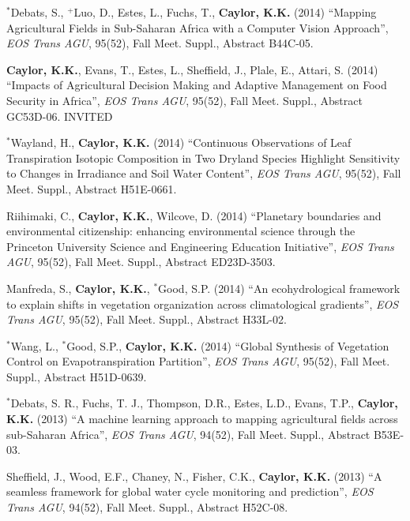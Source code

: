 \documentclass[10pt]{report}
\begin{document}
\begin{etaremune}
\item $^{*}$Debats, S., $^{+}$Luo, D., Estes, L., Fuchs, T.,  \textbf{Caylor, K.K.} (2014) ``Mapping Agricultural Fields in Sub-Saharan Africa with a Computer Vision Approach'', \emph{EOS Trans AGU}, 95(52), Fall Meet. Suppl., Abstract  B44C-05. 

\item \textbf{Caylor, K.K.}, Evans, T.,  Estes, L.,  Sheffield, J., Plale, E.,  Attari, S. (2014) ``Impacts of Agricultural Decision Making and Adaptive Management on Food Security in Africa'',  \emph{EOS Trans AGU}, 95(52), Fall Meet. Suppl., Abstract GC53D-06. INVITED

\item $^{*}$Wayland, H., \textbf{Caylor, K.K.} (2014) ``Continuous Observations of Leaf Transpiration Isotopic Composition in Two Dryland Species Highlight Sensitivity to Changes in Irradiance and Soil Water Content'',  \emph{EOS Trans AGU}, 95(52), Fall Meet. Suppl., Abstract  H51E-0661.

\item  Riihimaki, C., \textbf{Caylor, K.K.}, Wilcove, D. (2014) ``Planetary boundaries and environmental citizenship: enhancing environmental science through the Princeton University Science and Engineering Education Initiative'',  \emph{EOS Trans AGU}, 95(52), Fall Meet. Suppl., Abstract  ED23D-3503.

\item Manfreda, S., \textbf{Caylor, K.K.}, $^{*}$Good, S.P. (2014) ``An ecohydrological framework to explain shifts in vegetation organization across climatological gradients'', \emph{EOS Trans AGU}, 95(52), Fall Meet. Suppl., Abstract H33L-02.

\item $^{*}$Wang, L., $^{*}$Good, S.P., \textbf{Caylor, K.K.} (2014) ``Global Synthesis of Vegetation Control on Evapotranspiration Partition'',  \emph{EOS Trans AGU}, 95(52), Fall Meet. Suppl., Abstract H51D-0639.

\item $^{*}$Debats, S. R., Fuchs, T. J., Thompson, D.R., Estes, L.D., Evans, T.P., \textbf{Caylor, K.K.} (2013) ``A machine learning approach to mapping agricultural fields across sub-Saharan Africa'', \emph{EOS Trans AGU}, 94(52), Fall Meet. Suppl., Abstract B53E-03. 

\item Sheffield, J., Wood, E.F., Chaney, N., Fisher, C.K., \textbf{Caylor, K.K.} (2013) ``A seamless  framework for global water cycle monitoring and prediction'', \emph{EOS Trans AGU}, 94(52), Fall Meet. Suppl., Abstract H52C-08.


\end{etaremune}
\end{document}
